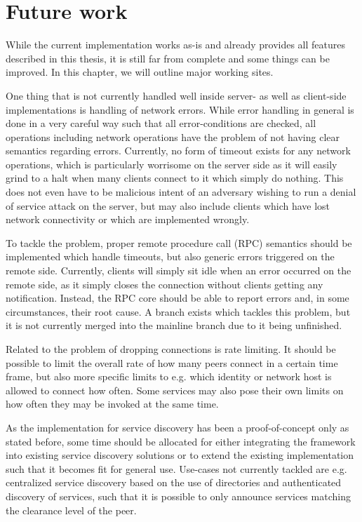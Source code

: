 \section{Future work}

While the current implementation works as-is and already provides all features described in this thesis, it is still far from complete and some things can be improved.
In this chapter, we will outline major working sites.

One thing that is not currently handled well inside server- as well as client-side implementations is handling of network errors.
While error handling in general is done in a very careful way such that all error-conditions are checked, all operations including network operations have the problem of not having clear semantics regarding errors.
Currently, no form of timeout exists for any network operations, which is particularly worrisome on the server side as it will easily grind to a halt when many clients connect to it which simply do nothing.
This does not even have to be malicious intent of an adversary wishing to run a denial of service attack on the server, but may also include clients which have lost network connectivity or which are implemented wrongly.

To tackle the problem, proper remote procedure call (RPC) semantics should be implemented which handle timeouts, but also generic errors triggered on the remote side.
Currently, clients will simply sit idle when an error occurred on the remote side, as it simply closes the connection without clients getting any notification.
Instead, the RPC core should be able to report errors and, in some circumstances, their root cause.
A branch exists which tackles this problem, but it is not currently merged into the mainline branch due to it being unfinished.

Related to the problem of dropping connections is rate limiting.
It should be possible to limit the overall rate of how many peers connect in a certain time frame, but also more specific limits to e.g. which identity or network host is allowed to connect how often.
Some services may also pose their own limits on how often they may be invoked at the same time.

As the implementation for service discovery has been a proof-of-concept only as stated before, some time should be allocated for either integrating the framework into existing service discovery solutions or to extend the existing implementation such that it becomes fit for general use.
Use-cases not currently tackled are e.g. centralized service discovery based on the use of directories and authenticated discovery of services, such that it is possible to only announce services matching the clearance level of the peer.

